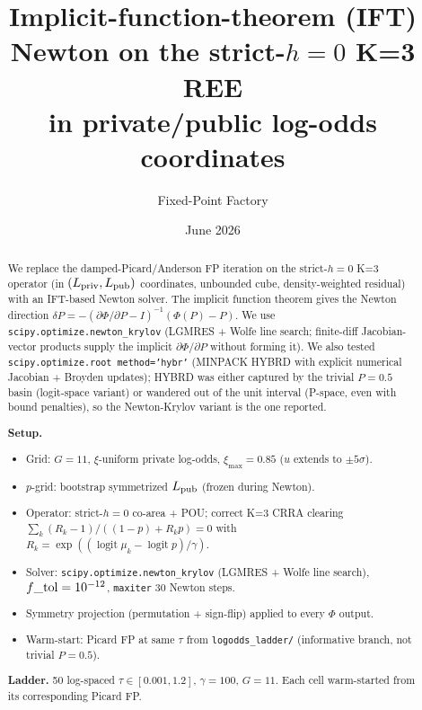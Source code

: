 \documentclass[11pt]{article}
\title{Implicit-function-theorem (IFT) Newton on the strict-$h{=}0$ K=3 REE \\
       in private/public log-odds coordinates}
\author{Fixed-Point Factory}
\date{June 2026}
\begin{document}
\maketitle

\begin{abstract}
We replace the damped-Picard/Anderson FP iteration on the strict-$h{=}0$
K=3 operator (in $(L_{\rm priv}, L_{\rm pub})$ coordinates, unbounded
cube, density-weighted residual) with an IFT-based Newton solver.
The implicit function theorem gives the Newton direction
$\delta P = -(\partial \Phi/\partial P - I)^{-1} (\Phi(P) - P)$.
We use \texttt{scipy.optimize.newton\_krylov} (LGMRES + Wolfe line
search; finite-diff Jacobian-vector products supply the implicit
$\partial \Phi/\partial P$ without forming it). We also tested
\texttt{scipy.optimize.root method='hybr'} (MINPACK HYBRD with explicit
numerical Jacobian + Broyden updates); HYBRD was either captured by
the trivial $P{=}0.5$ basin (logit-space variant) or wandered out of
the unit interval (P-space, even with bound penalties), so the
Newton-Krylov variant is the one reported.

\smallskip
\noindent\textbf{Setup.}
\begin{itemize}\itemsep1pt
  \item Grid: $G = 11$, $\xi$-uniform private log-odds, $\xi_{\max} = 0.85$
        ($u$ extends to $\pm 5\sigma$).
  \item $p$-grid: bootstrap symmetrized $L_{\rm pub}$ (frozen during Newton).
  \item Operator: strict-$h{=}0$ co-area + POU; correct K=3 CRRA clearing
        $\sum_k (R_k - 1)/((1-p) + R_k p) = 0$ with
        $R_k = \exp((\operatorname{logit}\mu_k - \operatorname{logit}p)/\gamma)$.
  \item Solver: \texttt{scipy.optimize.newton\_krylov} (LGMRES + Wolfe
        line search), $f\_{\rm tol} = 10^{-12}$, \texttt{maxiter} 30 Newton steps.
  \item Symmetry projection (permutation + sign-flip) applied to every $\Phi$ output.
  \item Warm-start: Picard FP at same $\tau$ from
        \texttt{logodds\_ladder/} (informative branch, not trivial $P{=}0.5$).
\end{itemize}

\smallskip
\noindent\textbf{Ladder.} 50 log-spaced $\tau \in [0.001, 1.2]$,
$\gamma = 100$, $G = 11$. Each cell warm-started from its corresponding
Picard FP.
\end{abstract}
\end{document}
